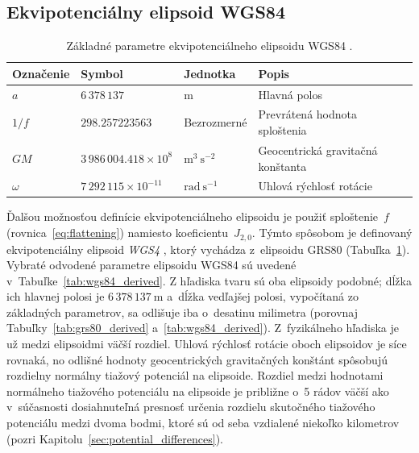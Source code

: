 \documentclass[a4paper, 12pt]{book}
\begin{document}
\subsection{Ekvipotenciálny elipsoid WGS84}
\label{sec:wgs84}

\begin{table}
\begin{center}
\caption{Základné parametre ekvipotenciálneho elipsoidu WGS84 
\parencite{WGS84}.}
\label{tab:wgs84_fundamental}
\small
\begin{tabular}{l l l l}
\hline
Označenie & Symbol & Jednotka & Popis\\
\hline
$a$       & $6\,378\,137$ & m & Hlavná polos\\
$1 \slash f$ & $298.257223563$ & Bezrozmerné & Prevrátená hodnota sploštenia\\
$GM$ & $3\,986\,004.418 \times 10^8$ & $\mathrm{m}^3 \ \mathrm{s}^{-2}$ 
& Geocentrická gravitačná konštanta\\
$\omega$ & $7\,292\,115 \times 10^{-11}$ & $\mathrm{rad} \ \mathrm{s}^{-1}$ 
& Uhlová rýchlosť rotácie\\
\hline
\end{tabular}
\end{center}
\end{table}

Ďalšou možnosťou definície ekvipotenciálneho elipsoidu je použiť sploštenie~$f$ 
(rovnica~\ref{eq:flattening}) namiesto koeficientu~$J_{2,0}$.  Týmto spôsobom 
je definovaný ekvipotenciálny elipsoid \emph{WGS4} 
\parencite[angl. \textit{World Geodetic System~1984};][]{WGS84}, ktorý vychádza 
z~elipsoidu GRS80 (Tabuľka~\ref{tab:wgs84_fundamental}).  Vybraté odvodené 
parametre elipsoidu WGS84 sú uvedené v~Tabuľke~\ref{tab:wgs84_derived}.  
Z hľadiska tvaru sú oba elipsoidy podobné; dĺžka ich hlavnej polosi je $6\, 
378\, 137\ \mathrm{m}$ a~dĺžka vedľajšej polosi, vypočítaná zo základných 
parametrov, sa odlišuje iba o~desatinu milimetra (porovnaj 
Tabuľky~\ref{tab:grs80_derived} a~\ref{tab:wgs84_derived}).  Z~fyzikálneho 
hľadiska je už medzi elipsoidmi väčší rozdiel.  Uhlová rýchlosť rotácie oboch 
elipsoidov je síce rovnaká, no odlišné hodnoty geocentrických gravitačných 
konštánt spôsobujú rozdielny normálny tiažový potenciál na elipsoide.  Rozdiel 
medzi hodnotami normálneho tiažového potenciálu na elipsoide je približne o~5 
rádov väčší ako v~súčasnosti dosiahnuteľná presnosť určenia rozdielu skutočného 
tiažového potenciálu medzi dvoma bodmi, ktoré sú od seba vzdialené niekoľko 
kilometrov (pozri Kapitolu~\ref{sec:potential_differences}).
\end{document}
